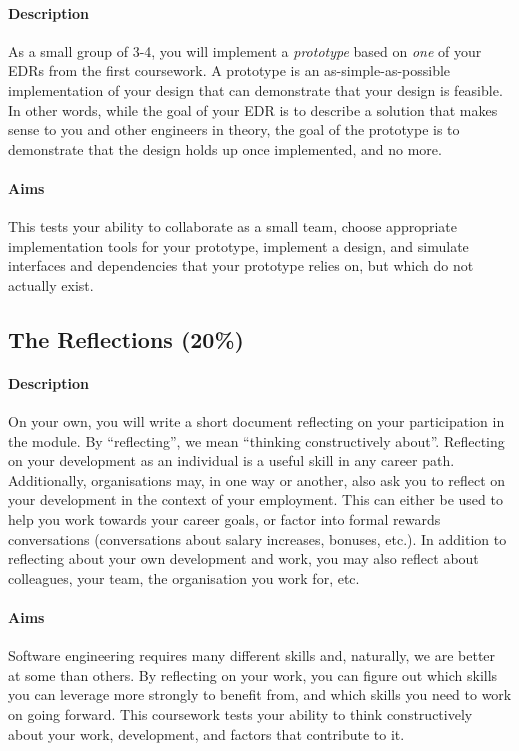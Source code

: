 \paragraph{Description} As a small group of 3-4, you will implement a \emph{prototype} based on \emph{one} of your EDRs from the first coursework. A prototype is an as-simple-as-possible implementation of your design that can demonstrate that your design is feasible. In other words, while the goal of your EDR is to describe a solution that makes sense to you and other engineers in theory, the goal of the prototype is to demonstrate that the design holds up once implemented, and no more.

\paragraph{Aims} This tests your ability to collaborate as a small team, choose appropriate implementation tools for your prototype, implement a design, and simulate interfaces and dependencies that your prototype relies on, but which do not actually exist.

\subsection{The Reflections (20\%)}

\paragraph{Description} On your own, you will write a short document reflecting on your participation in the module. By ``reflecting'', we mean ``thinking constructively about''. Reflecting on your development as an individual is a useful skill in any career path. Additionally, organisations may, in one way or another, also ask you to reflect on your development in the context of your employment. This can either be used to help you work towards your career goals, or factor into formal rewards conversations (conversations about salary increases, bonuses, etc.). In addition to reflecting about your own development and work, you may also reflect about colleagues, your team, the organisation you work for, etc.

\paragraph{Aims} Software engineering requires many different skills and, naturally, we are better at some than others. By reflecting on your work, you can figure out which skills you can leverage more strongly to benefit from, and which skills you need to work on going forward. This coursework tests your ability to think constructively about your work, development, and factors that contribute to it.
